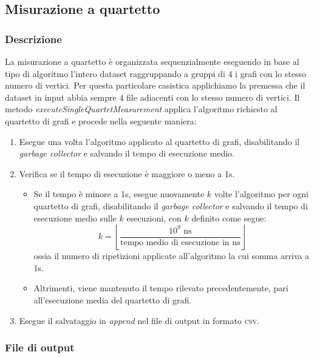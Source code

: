 \subsection{Misurazione a quartetto}

\subsubsection{Descrizione} 

La misurazione a quartetto è organizzata sequenzialmente eseguendo in base al tipo di algoritmo l'intero dataset raggruppando a gruppi di 4 i grafi con lo stesso numero di vertici. Per questa particolare casistica applichiamo la premessa che il dataset in input abbia sempre 4 file adiacenti con lo stesso numero di vertici. Il metodo \textit{executeSingleQuartetMeasurement} applica l'algoritmo richiesto al quartetto di grafi e procede nella seguente maniera:

\begin{enumerate}
    \item Esegue una volta l'algoritmo applicato al quartetto di grafi, disabilitando il \textit{garbage collector} e salvando il tempo di esecuzione medio.
    \item Verifica se il tempo di esecuzione è maggiore o meno a 1s.
    \begin{itemize}
        \item Se il tempo è minore a 1s, esegue nuovamente \(k\) volte l'algoritmo per ogni quartetto di grafi, disabilitando il \textit{garbage collector} e salvando il tempo di esecuzione medio sulle \(k\) esecuzioni, con \(k\) definito come segue:  \[ k = \left\lfloor\frac{10^9 \textrm{ ns}}{\textrm{tempo medio di esecuzione in ns}}\right\rfloor\]
        ossia il numero di ripetizioni applicate all'algoritmo la cui somma arriva a 1s.
        \item Altrimenti, viene mantenuto il tempo rilevato precedentemente, pari all'esecuzione media del quartetto di grafi.
    \end{itemize}
    \item Esegue il salvataggio in \textit{append} nel file di output in formato \textsc{csv}.
\end{enumerate}


\subsubsection{File di output}


